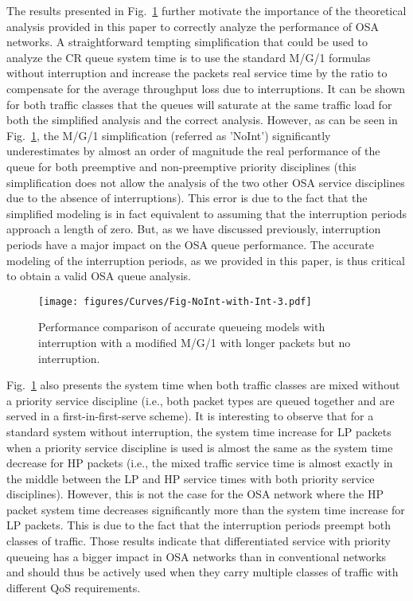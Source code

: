 \documentclass[11pt,journal,oneside,onecolumn,draftclsnofoot]{IEEEtran}
\begin{document}
The results presented in Fig.~\ref{Fig-NoInt-with-Int-3} further motivate the importance of the theoretical analysis provided in this paper to correctly analyze the performance of OSA networks. A straightforward tempting simplification that could be used to analyze the CR queue system time is to use the standard M/G/1 formulas without interruption and increase the packets real service time   by the ratio  to compensate for the average throughput loss due to interruptions. It can be shown for both traffic classes that the queues will saturate at the same traffic load for both the simplified analysis and the correct analysis. However, as can be seen in Fig.~\ref{Fig-NoInt-with-Int-3}, the M/G/1 simplification (referred as 'NoInt') significantly underestimates by almost an order of magnitude the real performance of the queue for both preemptive and non-preemptive priority disciplines (this simplification does not allow the analysis of the two other OSA service disciplines due to the absence of interruptions). This error is due to the fact that the simplified modeling is in fact equivalent to assuming that the interruption periods approach a length of zero. But, as we have discussed previously, interruption periods have a major impact on the OSA queue performance. The accurate modeling of the interruption periods, as we provided in this paper, is thus critical to obtain a valid OSA queue analysis.
\begin{figure}\texttt{[image: figures/Curves/Fig-NoInt-with-Int-3.pdf]}\caption{Performance comparison of accurate queueing models with interruption with a modified M/G/1 with longer packets but no interruption.}\label{Fig-NoInt-with-Int-3}\end{figure}

Fig.~\ref{Fig-NoInt-with-Int-3} also presents the system time when both traffic classes are mixed without a priority service discipline (i.e., both packet types are queued together and are served in a first-in-first-serve scheme). It is interesting to observe that for a standard system without interruption, the system time increase for LP packets when a priority service discipline is used is almost the same as the system time decrease for HP packets (i.e., the mixed traffic service time is almost exactly in the middle between the LP and HP service times with both priority service disciplines). However, this is not the case for the OSA network where the HP packet system time decreases significantly more than the system time increase for LP packets. This is due to the fact that the interruption periods preempt both classes of traffic. Those results indicate that differentiated service with priority queueing has a bigger impact in  OSA networks than in conventional networks and should thus be actively used when they carry multiple classes of traffic with different QoS requirements.
\end{document}

